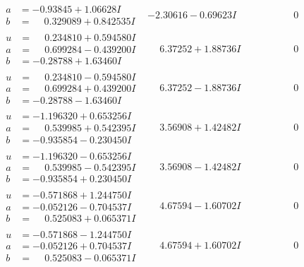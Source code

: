 \documentclass[1p]{elsarticle_modified}
\theoremstyle{definition}
\begin{document}
$$\begin{array}{c|c|c}
\begin{aligned}
a &= -0.93845 + 1.06628 I \\
b &= \phantom{-}0.329089 + 0.842535 I\end{aligned}
 & -2.30616 - 0.69623 I & \phantom{-0.000000 } 0 \\ \hline\begin{aligned}
u &= \phantom{-}0.234810 + 0.594580 I \\
a &= \phantom{-}0.699284 - 0.439200 I \\
b &= -0.28788 + 1.63460 I\end{aligned}
 & \phantom{-}6.37252 + 1.88736 I & \phantom{-0.000000 } 0 \\ \hline\begin{aligned}
u &= \phantom{-}0.234810 - 0.594580 I \\
a &= \phantom{-}0.699284 + 0.439200 I \\
b &= -0.28788 - 1.63460 I\end{aligned}
 & \phantom{-}6.37252 - 1.88736 I & \phantom{-0.000000 } 0 \\ \hline\begin{aligned}
u &= -1.196320 + 0.653256 I \\
a &= \phantom{-}0.539985 + 0.542395 I \\
b &= -0.935854 - 0.230450 I\end{aligned}
 & \phantom{-}3.56908 + 1.42482 I & \phantom{-0.000000 } 0 \\ \hline\begin{aligned}
u &= -1.196320 - 0.653256 I \\
a &= \phantom{-}0.539985 - 0.542395 I \\
b &= -0.935854 + 0.230450 I\end{aligned}
 & \phantom{-}3.56908 - 1.42482 I & \phantom{-0.000000 } 0 \\ \hline\begin{aligned}
u &= -0.571868 + 1.244750 I \\
a &= -0.052126 - 0.704537 I \\
b &= \phantom{-}0.525083 + 0.065371 I\end{aligned}
 & \phantom{-}4.67594 - 1.60702 I & \phantom{-0.000000 } 0 \\ \hline\begin{aligned}
u &= -0.571868 - 1.244750 I \\
a &= -0.052126 + 0.704537 I \\
b &= \phantom{-}0.525083 - 0.065371 I\end{aligned}
 & \phantom{-}4.67594 + 1.60702 I & \phantom{-0.000000 } 0\\

\end{array}$$
\end{document}
